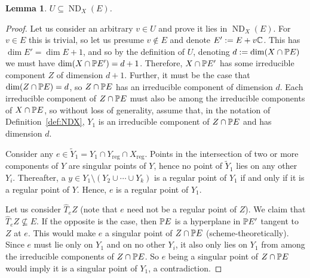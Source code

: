 \documentclass[a4paper,10pt]{article}
\def\reg{\text{reg}}
\DeclareMathOperator{\ND}{ND}
\newtheorem{lemma}[theorem]{Lemma}
\theoremstyle{definition}
\theoremstyle{remark}
\begin{document}
\begin{lemma}
    \label{lem:general}
    $U\subseteq \ND_X(E)$.
\end{lemma}
\begin{proof}
    Let us consider an arbitrary $v\in U$ and prove it lies in $\ND_X(E)$. For $v\in E$ this is trivial, so let us presume $v\notin E$ and denote $E':= E+v\ce$. This has $\dim E' = \dim E+1$, and so by the definition of $U$, denoting $d:=\dim(X\cap \pe E)$ we must have $\dim(X\cap \pe E') = d+1$. Therefore, $X\cap \pe E'$ has some irreducible component $Z$ of dimension $d+1$. Further, it must be the case that $\dim(Z\cap \pe E) = d$, so $Z\cap \pe E$ has an irreducible component of dimension $d$. Each irreducible component of $Z\cap \pe E$ must also be among the irreducible components of $X\cap \pe E$, so without loss of generality, assume that, in the notation of Definition~\ref{def:NDX}, $Y_1$ is an irreducible component of $Z\cap\pe E$ and has dimension $d$.

    Consider any $e\in \tilde Y_1 = Y_1\cap Y_\reg\cap X_\reg$. Points in the intersection of two or more components of $Y$ are singular points of $Y$, hence no point of $\tilde Y_1$ lies on any other $Y_i$. Thereafter, a $y\in Y_1\setminus (Y_2\cup\cdots\cup Y_k)$ is a regular point of $Y_1$ if and only if it is a regular point of $Y$. Hence, $e$ is a regular point of $Y_1$.

    Let us consider $\hat T_e Z$ (note that $e$ need not be a regular point of $Z$). We claim that $\hat T_eZ\nsubseteq E$. If the opposite is the case, then $\pe E$ is a hyperplane in $\pe E'$ tangent to $Z$ at $e$. This would make $e$ a singular point of $Z\cap \pe E$ (scheme-theoretically). Since $e$ must lie only on $Y_1$ and on no other $Y_i$, it also only lies on $Y_1$ from among the irreducible components of $Z\cap \pe E$. So $e$ being a singular point of $Z\cap \pe E$ would imply it is a singular point of $Y_1$, a contradiction.


\end{proof}
\end{document}

